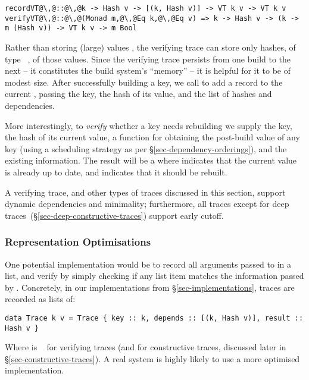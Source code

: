 \begin{verbatim}
recordVT@\,@::@\,@k -> Hash v -> [(k, Hash v)] -> VT k v -> VT k v
verifyVT@\,@::@\,@(Monad m,@\,@Eq k,@\,@Eq v) => k -> Hash v -> (k -> m (Hash v)) -> VT k v -> m Bool
\end{verbatim}

\noindent
Rather than storing (large) values , the verifying trace  can store
only hashes, of type ~, of those values. Since the verifying
trace persists from one build to the next -- it constitutes the build system's
``memory'' -- it is helpful for it to be of modest size. After successfully
building a key, we call  to add a record to the current ,
passing the key, the hash of its value, and the list of hashes and dependencies.

More interestingly, to \emph{verify} whether a key needs rebuilding we supply
the key, the hash of its current value, a function for obtaining the post-build
value of any key (using a scheduling strategy as per
\S\ref{sec-dependency-orderings}), and the existing  information. The
result will be a  where  indicates that the current value is
already up to date, and  indicates that it should be rebuilt.

A verifying trace, and other types of traces discussed in this section, support
dynamic dependencies and minimality; furthermore, all traces except for deep
traces~(\S\ref{sec-deep-constructive-traces}) support early cutoff.

\subsubsection{Representation Optimisations}

One potential implementation would be to record all arguments passed to
 in a list, and verify by simply checking if any list item matches
the information passed by . Concretely,
in our implementations from \S\ref{sec-implementations}, traces are recorded as lists of:

\begin{verbatim}
data Trace k v = Trace { key :: k, depends :: [(k, Hash v)], result :: Hash v }
\end{verbatim}

\noindent Where  is ~ for verifying traces (and  for constructive traces, discussed later in \S\ref{sec-constructive-traces}). A real system is highly likely to use a more optimised implementation.


